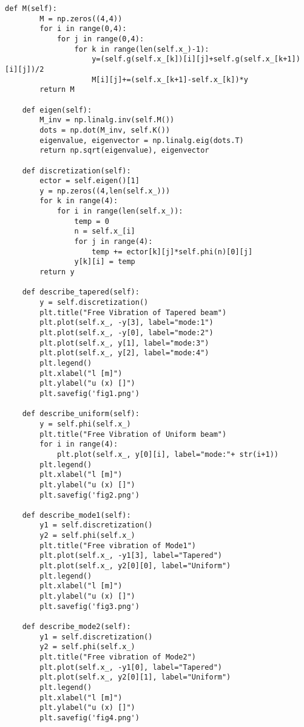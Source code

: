 \documentclass[12pt]{jsarticle}
\begin{document}
\begin{lstlisting}[caption=trapezoid.py,label=fuga]
    def M(self):
        M = np.zeros((4,4))
        for i in range(0,4):
            for j in range(0,4):
                for k in range(len(self.x_)-1):
                    y=(self.g(self.x_[k])[i][j]+self.g(self.x_[k+1])[i][j])/2
                    M[i][j]+=(self.x_[k+1]-self.x_[k])*y 
        return M
    
    def eigen(self):
        M_inv = np.linalg.inv(self.M())
        dots = np.dot(M_inv, self.K())
        eigenvalue, eigenvector = np.linalg.eig(dots.T)
        return np.sqrt(eigenvalue), eigenvector

    def discretization(self):
        ector = self.eigen()[1]
        y = np.zeros((4,len(self.x_)))
        for k in range(4):
            for i in range(len(self.x_)):
                temp = 0
                n = self.x_[i]
                for j in range(4):
                    temp += ector[k][j]*self.phi(n)[0][j]
                y[k][i] = temp
        return y        

    def describe_tapered(self):
        y = self.discretization()
        plt.title("Free Vibration of Tapered beam")
        plt.plot(self.x_, -y[3], label="mode:1")
        plt.plot(self.x_, -y[0], label="mode:2")
        plt.plot(self.x_, y[1], label="mode:3")
        plt.plot(self.x_, y[2], label="mode:4")
        plt.legend()
        plt.xlabel("l [m]")
        plt.ylabel("u (x) []")
        plt.savefig('fig1.png')
        
    def describe_uniform(self):
        y = self.phi(self.x_)
        plt.title("Free Vibration of Uniform beam")
        for i in range(4):
            plt.plot(self.x_, y[0][i], label="mode:"+ str(i+1))
        plt.legend()
        plt.xlabel("l [m]")
        plt.ylabel("u (x) []")
        plt.savefig('fig2.png')
    
    def describe_mode1(self):
        y1 = self.discretization()
        y2 = self.phi(self.x_)
        plt.title("Free vibration of Mode1")
        plt.plot(self.x_, -y1[3], label="Tapered")
        plt.plot(self.x_, y2[0][0], label="Uniform")
        plt.legend()
        plt.xlabel("l [m]")
        plt.ylabel("u (x) []")
        plt.savefig('fig3.png')
        
    def describe_mode2(self):
        y1 = self.discretization()
        y2 = self.phi(self.x_)
        plt.title("Free vibration of Mode2")
        plt.plot(self.x_, -y1[0], label="Tapered")
        plt.plot(self.x_, y2[0][1], label="Uniform")
        plt.legend()
        plt.xlabel("l [m]")
        plt.ylabel("u (x) []")
        plt.savefig('fig4.png')
        

\end{lstlisting}
\end{document}
